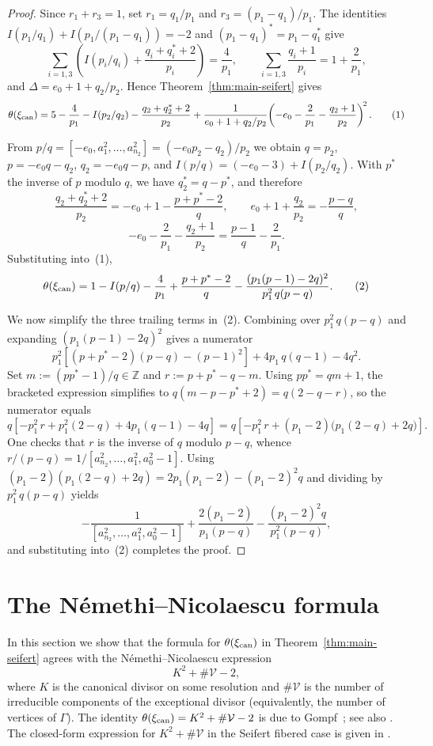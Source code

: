 \documentclass[11pt]{amsart}
\theoremstyle{plain}
\theoremstyle{definition}
\theoremstyle{remark}
\newcommand{\Z}{\mathbb{Z}}
\begin{document}
\begin{proof}
Since $r_1+r_3=1$, set $r_1=q_1/p_1$ and $r_3=(p_1-q_1)/p_1$. The
identities $I(p_1/q_1)+I(p_1/(p_1-q_1))=-2$ and
$(p_1-q_1)^*=p_1-q_1^*$ give
\[
\sum_{i=1,3}\!\left(I(p_i/q_i)+\frac{q_i+q_i^*+2}{p_i}\right)=\frac{4}{p_1},
\qquad
\sum_{i=1,3}\frac{q_i+1}{p_i}=1+\frac{2}{p_1},
\]
and $\Delta=e_0+1+q_2/p_2$. Hence Theorem~\ref{thm:main-seifert} gives
\[
\theta(\xi_{\rm can})
=
5-\frac{4}{p_1}
-I(p_2/q_2)-\frac{q_2+q_2^*+2}{p_2}
+\frac{1}{e_0+1+q_2/p_2}
\!\left(-e_0-\frac{2}{p_1}-\frac{q_2+1}{p_2}\right)^{\!2}.
\tag{1}
\]

From $p/q=[-e_0,a^2_1,\dots,a^2_{n_2}]=(-e_0p_2-q_2)/p_2$ we obtain
$q=p_2$, $p=-e_0q-q_2$, $q_2=-e_0q-p$, and
$I(p/q)=(-e_0-3)+I(p_2/q_2)$. With $p^*$ the inverse of $p$ modulo
$q$, we have $q_2^*=q-p^*$, and therefore
\[
\frac{q_2+q_2^*+2}{p_2}=-e_0+1-\frac{p+p^*-2}{q},\qquad
e_0+1+\frac{q_2}{p_2}=-\frac{p-q}{q},
\]
\[
-e_0-\frac{2}{p_1}-\frac{q_2+1}{p_2}=\frac{p-1}{q}-\frac{2}{p_1}.
\]
Substituting into~(1),
\[
\theta(\xi_{\rm can})
=
1-I(p/q)-\frac{4}{p_1}
+\frac{p+p^*-2}{q}
-\frac{(p_1(p-1)-2q)^2}{p_1^2\,q(p-q)}.
\tag{2}
\]

We now simplify the three trailing terms in~(2). Combining over
$p_1^2\,q(p-q)$ and expanding $(p_1(p-1)-2q)^2$ gives a numerator
\[
p_1^2\!\left[(p+p^*-2)(p-q)-(p-1)^2\right]+4p_1\,q(q-1)-4q^2.
\]
Set $m:=(pp^*-1)/q\in\Z$ and $r:=p+p^*-q-m$. Using $pp^*=qm+1$, the
bracketed expression simplifies to $q(m-p-p^*+2)=q(2-q-r)$, so the
numerator equals
\[
q\!\left[-p_1^2\,r+p_1^2(2-q)+4p_1(q-1)-4q\right]
=
q\!\left[-p_1^2\,r+(p_1-2)\bigl(p_1(2-q)+2q\bigr)\right].
\]
One checks that $r$ is the inverse of $q$ modulo $p-q$, whence
$r/(p-q)=1/[a^2_{n_2},\dots,a^2_1,a^2_0-1]$. Using
$(p_1-2)(p_1(2-q)+2q)=2p_1(p_1-2)-(p_1-2)^2 q$ and dividing by
$p_1^2\,q(p-q)$ yields
\[
-\frac{1}{[a^2_{n_2},\dots,a^2_1,a^2_0-1]}
+\frac{2(p_1-2)}{p_1(p-q)}
-\frac{(p_1-2)^2 q}{p_1^2(p-q)},
\]
and substituting into~(2) completes the proof.
\end{proof}

\section{The N\'{e}methi--Nicolaescu formula}\label{sec:nn}

In this section we show that the formula for $\theta(\xi_{\rm can})$
in Theorem~\ref{thm:main-seifert} agrees with the
N\'{e}methi--Nicolaescu expression
\[
K^2+\#\mathcal{V}-2,
\]
where $K$ is the canonical divisor on some resolution and
$\#\mathcal{V}$ is the number of irreducible components of the
exceptional divisor (equivalently, the number of vertices of
$\Gamma$). The identity
$\theta(\xi_{\rm can})=K^2+\#\mathcal{V}-2$ is due to
Gompf~\cite{Gompf98}; see also
\cite[Remark~4.8]{NemethiNicolaescu2002}. The closed-form expression
for $K^2+\#\mathcal{V}$ in the Seifert fibered case is given in
\cite[\S5]{NemethiNicolaescu2002}.
\end{document}
